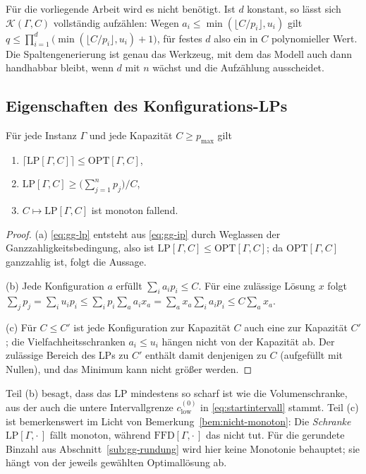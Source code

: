 Für die vorliegende Arbeit wird es nicht benötigt.
Ist $d$ konstant, so lässt sich $\mathcal{K}(\Gamma, C)$ vollständig aufzählen: Wegen
$a_i \le \min(\lfloor C/p_i \rfloor, u_i)$ gilt
$q \le \prod_{i=1}^{d} \big(\min(\lfloor C/p_i \rfloor, u_i) + 1\big)$,
für festes $d$ also ein in $C$ polynomieller Wert.
Die Spaltengenerierung ist genau das Werkzeug, mit dem das Modell auch dann handhabbar bleibt,
wenn $d$ mit $n$ wächst und die Aufzählung ausscheidet.

\subsection{Eigenschaften des Konfigurations-LPs}
\label{sub:gg-eigenschaften}

\begin{lemma}
\label{lem:gg-schranken}
Für jede Instanz $\Gamma$ und jede Kapazität $C \ge p_{\max}$ gilt
\begin{enumerate}[label=(\alph*), nosep]
  \item $\big\lceil \mathrm{LP}[\Gamma, C] \big\rceil \le \mathrm{OPT}[\Gamma, C]$,
  \item $\mathrm{LP}[\Gamma, C] \ge \big(\sum_{j=1}^{n} p_j\big) / C$,
  \item $C \mapsto \mathrm{LP}[\Gamma, C]$ ist monoton fallend.
\end{enumerate}
\end{lemma}

\begin{proof}
(a) \eqref{eq:gg-lp} entsteht aus \eqref{eq:gg-ip} durch Weglassen der
Ganzzahligkeitsbedingung, also ist $\mathrm{LP}[\Gamma, C] \le \mathrm{OPT}[\Gamma, C]$;
da $\mathrm{OPT}[\Gamma, C]$ ganzzahlig ist, folgt die Aussage.

(b) Jede Konfiguration $a$ erfüllt $\sum_i a_i p_i \le C$.
Für eine zulässige Lösung $x$ folgt
$\sum_j p_j = \sum_i u_i p_i \le \sum_i p_i \sum_a a_i x_a
 = \sum_a x_a \sum_i a_i p_i \le C \sum_a x_a$.

(c) Für $C \le C'$ ist jede Konfiguration zur Kapazität $C$ auch eine zur Kapazität $C'$; die
Vielfachheitsschranken $a_i \le u_i$ hängen nicht von der Kapazität ab.
Der zulässige Bereich des LPs zu $C'$ enthält damit denjenigen zu $C$ (aufgefüllt mit Nullen),
und das Minimum kann nicht größer werden.
\end{proof}

Teil (b) besagt, dass das LP mindestens so scharf ist wie die Volumenschranke, aus der auch die
untere Intervallgrenze $c_{\mathrm{low}}^{(0)}$ in \eqref{eq:startintervall} stammt.
Teil (c) ist bemerkenswert im Licht von Bemerkung~\ref{bem:nicht-monoton}: Die \emph{Schranke}
$\mathrm{LP}[\Gamma, \cdot\,]$ fällt monoton, während $\mathrm{FFD}[\Gamma, \cdot\,]$ das nicht tut.
Für die gerundete Binzahl aus Abschnitt~\ref{sub:gg-rundung} wird hier keine Monotonie
behauptet; sie hängt von der jeweils gewählten Optimallösung ab.

